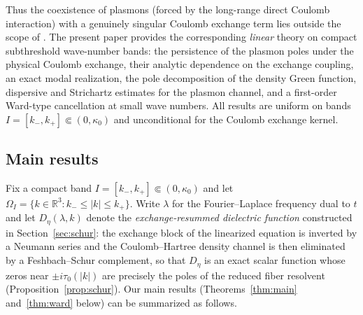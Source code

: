 \documentclass[11pt,a4paper]{amsart}
\theoremstyle{definition}
\theoremstyle{remark}
\newcommand{\R}{\mathbb{R}}
\begin{document}
Thus the coexistence of plasmons (forced by the long-range direct Coulomb interaction) with a genuinely singular Coulomb exchange term lies outside the scope of \cite{NY1,NY2,CDSM}. The present paper provides the corresponding \emph{linear} theory on compact subthreshold wave-number bands: the persistence of the plasmon poles under the physical Coulomb exchange, their analytic dependence on the exchange coupling, an exact modal realization, the pole decomposition of the density Green function, dispersive and Strichartz estimates for the plasmon channel, and a first-order Ward-type cancellation at small wave numbers. All results are uniform on bands $I=[k_-,k_+]\Subset(0,\kappa_0)$ and unconditional for the Coulomb exchange kernel.

\subsection{Main results}\label{sec:mainresults-intro}
Fix a compact band $I=[k_-,k_+]\Subset(0,\kappa_0)$ and let $\Omega_I=\{k\in\R^3:k_-\le|k|\le k_+\}$. Write $\lambda$ for the Fourier--Laplace frequency dual to $t$ and let $D_\eta(\lambda,k)$ denote the \emph{exchange-resummed dielectric function} constructed in Section~\ref{sec:schur}: the exchange block of the linearized equation is inverted by a Neumann series and the Coulomb--Hartree density channel is then eliminated by a Feshbach--Schur complement, so that $D_\eta$ is an exact scalar function whose zeros near $\pm i\tau_0(|k|)$ are precisely the poles of the reduced fiber resolvent (Proposition~\ref{prop:schur}). Our main results (Theorems~\ref{thm:main} and~\ref{thm:ward} below) can be summarized as follows.
\end{document}
